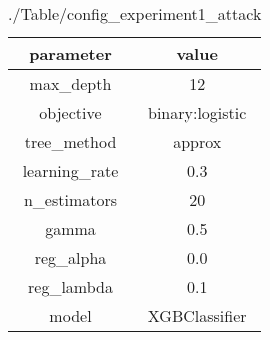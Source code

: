 \begin{table}[h]
\centering
\begin{tabular}{|c|c|}
\hline
parameter & value\\
\hline
max_depth & 12 \\\hline
objective & binary:logistic \\\hline
tree_method & approx \\\hline
learning_rate & 0.3 \\\hline
n_estimators & 20 \\\hline
gamma & 0.5 \\\hline
reg_alpha & 0.0 \\\hline
reg_lambda & 0.1 \\\hline
model & XGBClassifier \\\hline

\end{tabular}\caption{./Table/config_experiment1_attack}
\label{tab:./Table/config_experiment1_attack}
\end{table}
